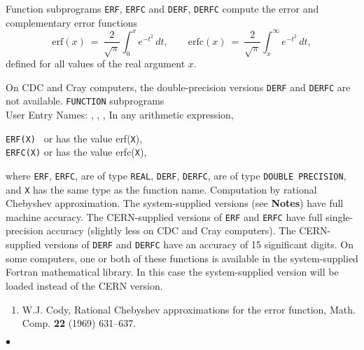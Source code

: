          
 
         
    
Function subprograms {\tt ERF}, {\tt ERFC} and {\tt DERF}, {\tt DERFC}
compute the error and complementary error functions
$$ \mathrm{erf}(x)  \ = \
\displaystyle \frac{2}{\sqrt\pi}\int_0^x  e^{-t^2}\, dt, \qquad
\mathrm{erfc}(x) \ = \
\displaystyle \frac{2}{\sqrt \pi}\int_x^\infty e^{-t^2}\, dt, $$
defined for all values of the real argument $x$.
\par
On CDC and Cray computers, the double-precision versions
{\tt DERF} and {\tt DERFC} are not available.
\Structure
{\tt FUNCTION} subprograms\\
User Entry Names: , , , 
\Usage
In any arithmetic expression,
\begin{center}
\parbox{.6\textwidth}{
{\tt ERF(X) } \quad or 
\quad has the value \quad erf({\tt X}),\\
{\tt ERFC(X)} \quad or \quad {\tt DERFC(X)}
\quad has the value \quad
erfc({\tt X}),}
\end{center}
where {\tt ERF}, {\tt ERFC}, are of type {\tt REAL},
{\tt DERF}, {\tt DERFC}, are of type
{\tt DOUBLE PRECISION}, and {\tt X} has the same type as the function
name.
\Method
Computation by rational Chebyshev approximation.
\Accuracy
The system-supplied versions (see {\bf Notes}) have full machine
accuracy. The CERN-supplied versions of {\tt ERF} and {\tt ERFC} have
full single-precision accuracy (slightly less on CDC and Cray
computers). The CERN-supplied versions of {\tt DERF} and {\tt DERFC}
have an accuracy  of 15 significant digits.
\Notes
On some computers,  one or both of these functions
is  available in the  system-supplied Fortran
mathematical  library. In this case the system-supplied
version will be loaded  instead of the CERN version.
\Refer
\begin{enumerate}
\item W.J. Cody, Rational Chebyshev approximations for the error
function, Math. Comp. {\bf 22} (1969) 631--637.
\end{enumerate}
$\bullet$
